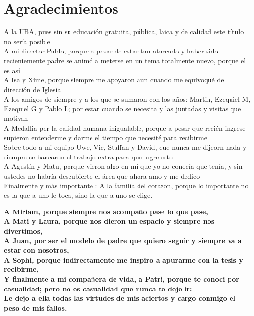 
\bigskip

\begingroup
\let\clearpage\relax
\let\cleardoublepage\relax
\let\cleardoublepage\relax
\chapter*{Agradecimientos}

\begin{center}
A la UBA, pues sin su educaci\'on gratuita, p\'ublica, laica y de calidad este t\'itulo no ser\'ia posible \\
A mi director Pablo, porque a pesar de estar tan atareado y haber sido recientemente padre se anim\'o a meterse en un tema totalmente nuevo, porque el es as\'i \\
A Isa y Xime, porque siempre me apoyaron aun cuando me equivoqu\'e de direcci\'on de Iglesia \\
A los amigos de siempre y a los que se sumaron con los a\~nos: Martin, Ezequiel M, Ezequiel G y Pablo L; por estar cuando se necesita y las juntadas y visitas que motivan \\
A Medallia por la calidad humana inigualable, porque a pesar que reci\'en ingrese supieron entenderme y darme el tiempo que necesit\'e para recibirme \\
Sobre todo a mi equipo Uwe, Vic, Staffan y David, que nunca me dijeorn nada y siempre se bancaron el trabajo extra para que logre esto \\
A Agust\'in y Matu, porque vieron algo en m\'i que yo no conoc\'ia que ten\'ia, y sin ustedes no habr\'ia descubierto el \'area que ahora amo y me dedico \\
Finalmente y m\'as importante : A la familia del corazon, porque lo importante no es la que a uno le toca, sino la que a uno se elige.
\linebreak
\linebreak

\textbf{
A Miriam, porque siempre nos acompa\~no pase lo que pase, \\
A Mati y Laura, porque nos dieron un espacio y siempre nos divertimos, \\
A Juan, por ser el modelo de padre que quiero seguir y siempre va a estar con nosotros, \\
A Sophi, porque indirectamente me inspiro a apurarme con la tesis y recibirme, \\
Y finalmente a mi compa\~nera de vida, a Patri, porque te conoci por casualidad; pero no es casualidad que nunca te deje ir: \\
Le dejo a ella todas las virtudes de mis aciertos y cargo conmigo el peso de mis fallos.
}
\end{center}
\endgroup



